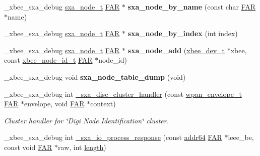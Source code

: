 \begin{DoxyCompactItemize}
\+\_\+xbee\+\_\+sxa\+\_\+debug \hyperlink{structsxa__node__t}{sxa\+\_\+node\+\_\+t} \hyperlink{group__hal_gaef060b3456fdcc093a7210a762d5f2ed}{F\+AR} $\ast$ {\bfseries sxa\+\_\+node\+\_\+by\+\_\+name} (const char \hyperlink{group__hal_gaef060b3456fdcc093a7210a762d5f2ed}{F\+AR} $\ast$name)
\item 
\mbox{\label{group___s_x_a_ga1712e218c433eb314121599866b9b886}} 
\+\_\+xbee\+\_\+sxa\+\_\+debug \hyperlink{structsxa__node__t}{sxa\+\_\+node\+\_\+t} \hyperlink{group__hal_gaef060b3456fdcc093a7210a762d5f2ed}{F\+AR} $\ast$ {\bfseries sxa\+\_\+node\+\_\+by\+\_\+index} (int index)
\item 
\mbox{\label{group___s_x_a_ga30754e1f60c895be7c4cf1818ea3e777}} 
\+\_\+xbee\+\_\+sxa\+\_\+debug \hyperlink{structsxa__node__t}{sxa\+\_\+node\+\_\+t} \hyperlink{group__hal_gaef060b3456fdcc093a7210a762d5f2ed}{F\+AR} $\ast$ {\bfseries sxa\+\_\+node\+\_\+add} (\hyperlink{structxbee__dev__t}{xbee\+\_\+dev\+\_\+t} $\ast$xbee, const \hyperlink{structxbee__node__id__t}{xbee\+\_\+node\+\_\+id\+\_\+t} \hyperlink{group__hal_gaef060b3456fdcc093a7210a762d5f2ed}{F\+AR} $\ast$node\+\_\+id)
\item 
\mbox{\label{group___s_x_a_ga63185b350cf48c154f2071931fd7d0d9}} 
\+\_\+xbee\+\_\+sxa\+\_\+debug void {\bfseries sxa\+\_\+node\+\_\+table\+\_\+dump} (void)
\item 
\+\_\+xbee\+\_\+sxa\+\_\+debug int \hyperlink{group___s_x_a_ga7129f2a09a9a49d26c50cbff75e50232}{\+\_\+sxa\+\_\+disc\+\_\+cluster\+\_\+handler} (const \hyperlink{structwpan__envelope__t}{wpan\+\_\+envelope\+\_\+t} \hyperlink{group__hal_gaef060b3456fdcc093a7210a762d5f2ed}{F\+AR} $\ast$envelope, void \hyperlink{group__hal_gaef060b3456fdcc093a7210a762d5f2ed}{F\+AR} $\ast$context)
\begin{DoxyCompactList}\small\item\em Cluster handler for \char`\"{}\+Digi Node Identification\char`\"{} cluster. \end{DoxyCompactList}\item 
\+\_\+xbee\+\_\+sxa\+\_\+debug int \hyperlink{group___s_x_a_ga8b7ff9c6ba3a7223a6061b8ec52e195e}{\+\_\+sxa\+\_\+io\+\_\+process\+\_\+response} (const \hyperlink{unionaddr64}{addr64} \hyperlink{group__hal_gaef060b3456fdcc093a7210a762d5f2ed}{F\+AR} $\ast$ieee\+\_\+be, const void \hyperlink{group__hal_gaef060b3456fdcc093a7210a762d5f2ed}{F\+AR} $\ast$raw, int \hyperlink{group__zdo_gab2b3adeb2a67e656ff030b56727fd0ac}{length})

\end{DoxyCompactItemize}
